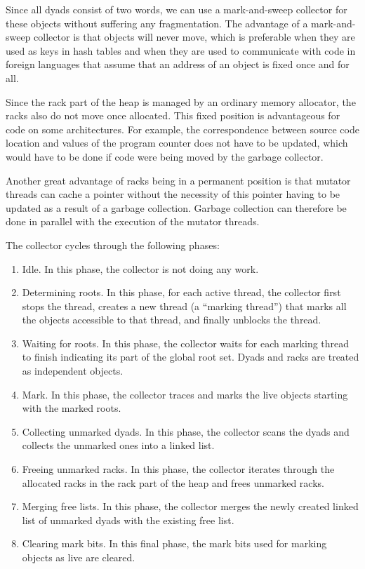 Since all dyads consist of two words, we can use a mark-and-sweep
collector for these objects without suffering any fragmentation.  The
advantage of a mark-and-sweep collector is that objects will never
move, which is preferable when they are used as keys in hash tables
and when they are used to communicate with code in foreign languages
that assume that an address of an object is fixed once and for all.

Since the rack part of the heap is managed by an ordinary memory
allocator, the racks also do not move once allocated.  This fixed
position is advantageous for code on some architectures.  For example,
the correspondence between source code location and values of the
program counter does not have to be updated, which would have to be
done if code were being moved by the garbage collector.

Another great advantage of racks being in a permanent position is that
mutator threads can cache a pointer without the necessity of this
pointer having to be updated as a result of a garbage collection.
Garbage collection can therefore be done in parallel with the
execution of the mutator threads.

The collector cycles through the following phases:

\begin{enumerate}
\item Idle.  In this phase, the collector is not doing any work.
\item Determining roots.  In this phase, for each active thread, the
  collector first stops the thread, creates a new thread (a ``marking
  thread'') that marks all the objects accessible to that thread, and
  finally unblocks the thread.
\item Waiting for roots.  In this phase, the collector waits for each
  marking thread to finish indicating its part of the global root set.
  Dyads and racks are treated as independent objects.
\item Mark.  In this phase, the collector traces and marks the
  live objects starting with the marked roots.
\item Collecting unmarked dyads.  In this phase, the collector
  scans the dyads and collects the unmarked ones into a linked list.
\item Freeing unmarked racks.  In this phase, the collector
  iterates through the allocated racks in the rack part of the heap
  and frees unmarked racks.
\item Merging free lists.  In this phase, the collector merges
  the newly created linked list of unmarked dyads with the existing
  free list.
\item Clearing mark bits.  In this final phase, the mark bits used for
  marking objects as live are cleared.
\end{enumerate}

